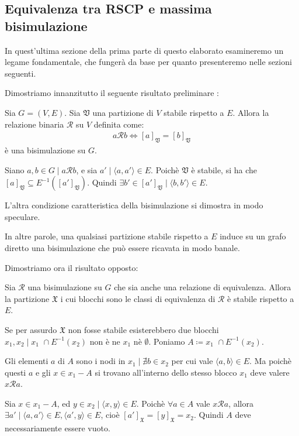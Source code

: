 \subsection{Equivalenza tra RSCP e massima bisimulazione}
In quest'ultima sezione della prima parte di questo elaborato esamineremo un legame fondamentale, che fungerà da base per quanto presenteremo nelle sezioni seguenti.

Dimostriamo innanzitutto il seguente risultato preliminare \cite{gentilini}:
\begin{proposition}
    Sia $G = (V,E)$. Sia $\mathfrak{V}$ una partizione di $V$ stabile rispetto a $E$. Allora la relazione binaria $\mathcal{R}$ su $V$ definita come:
    \begin{gather*}
        a \mathcal{R} b \iff [a]_\mathfrak{V} = [b]_\mathfrak{V}
    \end{gather*}
    è una bisimulazione su $G$.
    \label{prop:part_induce_bisi}
\end{proposition}
\begin{proof2}
    Siano $a,b \in G \mid a \mathcal{R} b$, e sia $a' \mid \langle a, a' \rangle \in E$. Poichè $\mathfrak{V}$ è stabile, si ha che $[a]_\mathfrak{V} \subseteq E^{-1}([a']_\mathfrak{V})$. Quindi $\exists b' \in [a']_\mathfrak{V} \mid \langle b, b' \rangle \in E$.

    L'altra condizione caratteristica della bisimulazione si dimostra in modo speculare.
\end{proof2}
In altre parole, una qualsiasi partizione stabile rispetto a $E$ induce su un grafo diretto una bisimulazione che può essere ricavata in modo banale.

Dimostriamo ora il risultato opposto:
\begin{proposition}
    Sia $\mathcal{R}$ una bisimulazione su $G$ che sia anche una relazione di equivalenza. Allora la partizione $\mathfrak{X}$ i cui blocchi sono le classi di equivalenza di $\mathcal{R}$ è stabile rispetto a $E$.
    \label{prop:bisi_induce_part}
\end{proposition}
\begin{proof2}
    Se per assurdo $\mathfrak{X}$ non fosse stabile esisterebbero due blocchi $x_1, x_2 \mid x_1 \,\,\cap E^{-1}(x_2)$ non è ne $x_1$ nè $\emptyset$. Poniamo $A \coloneqq x_1 \,\,\cap E^{-1}(x_2)$.

    Gli elementi $a$ di $A$ sono i nodi in $x_1 \mid \nexists b \in x_2$ per cui vale $\langle a, b \rangle \in E$. Ma poichè questi $a$ e gli $x \in x_1 - A$ si trovano all'interno dello stesso blocco $x_1$ deve valere $x \mathcal{R} a$.

    Sia $x \in x_1 - A$, ed $y \in x_2 \mid \langle x, y \rangle \in E$. Poichè $\forall a \in A$ vale $x \mathcal{R} a$, allora $\exists a' \mid \langle a, a' \rangle \in E, \langle a', y \rangle \in E$, cioè $[a']_\mathfrak{X} = [y]_\mathfrak{X} = x_2$. Quindi $A$ deve necessariamente essere vuoto.
\end{proof2}


